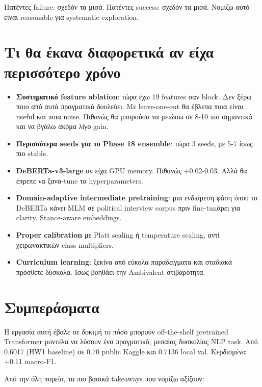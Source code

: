 \documentclass[12pt]{fphw}
\begin{document}
Πατέντες failure: σχεδόν τα μισά. Πατέντες success: σχεδόν τα μισά. Νομίζω αυτό είναι reasonable για systematic exploration.

\section{Τι θα έκανα διαφορετικά αν είχα περισσότερο χρόνο}

\begin{itemize}
    \item \textbf{Συστηματικό feature ablation}: τώρα έχω 19 features σαν block. Δεν ξέρω ποιο από αυτά πραγματικά δουλεύει. Με leave-one-out θα έβλεπα ποια είναι useful και ποια noise. Πιθανώς θα μπορούσα να μειώσω σε 8-10 πιο σημαντικά και να βγάλω ακόμα λίγο gain.
    \item \textbf{Περισσότερα seeds για το Phase 18 ensemble}: τώρα 3 seeds, με 5-7 ίσως πιο stable.
    \item \textbf{DeBERTa-v3-large} αν είχα GPU memory. Πιθανώς +0.02-0.03. Αλλά θα έπρεπε να ξανα-tune τα hyperparameters.
    \item \textbf{Domain-adaptive intermediate pretraining}: μια ενδιάμεση φάση όπου το DeBERTa κάνει MLM σε political interview corpus πριν fine-tunάρει για clarity. Stance-aware embeddings.
    \item \textbf{Proper calibration} με Platt scaling ή temperature scaling, αντί χειρωνακτικών class multipliers.
    \item \textbf{Curriculum learning}: ξεκίνα από εύκολα παραδείγματα και σταδιακά πρόσθετε δύσκολα. Ίσως βοηθάει την Ambivalent στιβαρότητα.
\end{itemize}

\section{Συμπεράσματα}

Η εργασία αυτή έβαλε σε δοκιμή το πόσο μπορούν off-the-shelf pretrained Transformer μοντέλα να λύσουν ένα πραγματικό, μεσαίας δυσκολίας NLP task. Από 0.6017 (HW1 baseline) σε 0.70 public Kaggle και 0.7136 local val. Κερδισμένα +0.11 macro-F1.

Από την όλη πορεία, τα πιο βασικά takeaways που νομίζω αξίζουν:
\end{document}
